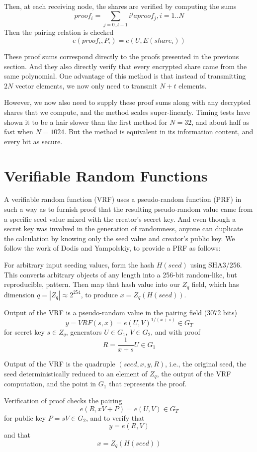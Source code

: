 \documentclass[article,oneside]{memoir}
\begin{document}
Then, at each receiving node, the shares are verified by computing the sums
$$ proof_i = \sum_{j=0..t-1} i^j aproof_j, i = 1..N$$
Then the pairing relation is checked
$$e(proof_i, P_i) = e(U,E(share_i))$$

These proof sums correspond directly to the proofs presented in the previous section. And they also directly verify that every encrypted share came from the same polynomial. One advantage of this method is that instead of transmitting $2 N$ vector elements, we now only need to transmit $N+t$ elements.

However, we now also need to supply these proof sums along with any decrypted shares that we compute, and the method scales super-linearly. Timing tests have shown it to be a hair slower than the first method for $N=32$, and about half as fast when $N=1024$. But the method is equivalent in its information content, and every bit as secure.

\chapter{Verifiable Random Functions}
A verifiable random function (VRF)\cite{vrf2} uses a pseudo-random function (PRF) in such a way as to furnish proof that the resulting pseudo-random value came from a specific seed value mixed with the creator's secret key. And even though a secret key was involved in the generation of randomness, anyone can duplicate the calculation by knowing only the seed value and creator's public key. We follow the work of Dodis and Yampolskiy\cite{vrf}, to provide a PRF as follows:

For arbitrary input seeding values, form the hash $H(seed)$ using SHA3/256. This converts arbitrary objects of any length into a 256-bit random-like, but reproducible, pattern. Then map that hash value into our $Z_q$ field, which has dimension $q = |Z_q| \approx 2^{254}$, to produce $x = Z_q(H(seed))$.

Output of the VRF is a pseudo-random value in the pairing field (3072 bits) $$y = VRF(s, x) = e(U,V)^{1/(x + s)} \in G_T$$ for secret key $s \in Z_q$,  generators $U \in G_1$, $V \in G_2$, and with proof $$R = \frac{1}{x+s}U \in G_1$$ 

Output of the VRF is the quadruple $(seed, x, y, R)$, i.e., the original seed, the seed deterministically reduced to an element of $Z_q$, the output of the VRF computation, and the point in $G_1$ that represents the proof.

Verification of proof checks the pairing $$e(R, x V + P) = e(U,V)  \in G_T$$ for public key $P = s V \in G_2$, and to verify that $$y = e(R,V)$$ and that $$x = Z_q(H(seed))$$
\end{document}
